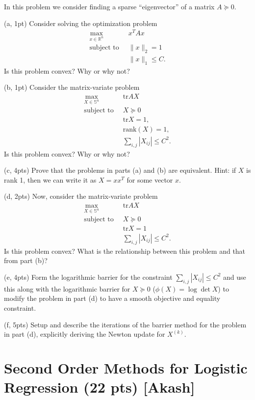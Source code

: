 \documentclass{article}
\theoremstyle{remark}
\theoremstyle{definition}
\newcommand{\st}{\mathop{\mathrm{subject\,\,to}}}
\def\tr{\mathrm{tr}}
\begin{document}
In this problem we consider finding a sparse ``eigenvector'' of a matrix $A
\succeq 0$.

\bigskip
\noindent
(a, 1pt) Consider solving the optimization problem
\[
\begin{split}
\max_{x\in\mathbb{R}^n} \;\; & x^TAx \\
\st \;\; & \|x\|_2 = 1 \\
\;\; & \|x\|_1 \le C.
\end{split}
\]
Is this problem convex? Why or why not?

\bigskip
\noindent
(b, 1pt) Consider the matrix-variate problem
\[
\begin{split}
\max_{X \in \mathbb{S}^n} \;\; & \tr AX \\
\st \;\; & X \succeq 0 \\
\;\; & \tr X = 1, \\ 
& \mathrm{rank}(X)=1, \\
& \sum_{i,j} |X_{ij}| \le C^2.
\end{split}
\]
Is this problem convex? Why or why not?
 
\bigskip
\noindent
(c, 4pts) Prove that the problems in parts (a) and (b) are equivalent.  Hint: if
$X$ is rank 1, then we can write it as $X=xx^T$ for some vector $x$.

\bigskip
\noindent
(d, 2pts) Now, consider the matrix-variate problem
\[
\begin{split}
\max_{X \in \mathbb{S}^n} \;\; & \tr AX \\
\st \;\; & X \succeq 0 \\
\;\; & \tr X = 1 \\
& \sum_{i,j} |X_{ij}| \le C^2.
\end{split}
\]
Is this problem convex?  What is the relationship between this problem and that
from part (b)?  

\bigskip
\noindent
(e, 4pts) Form the logarithmic barrier for the constraint $\sum_{i,j}|X_{ij}| \le C^2$
and use this along with the logarithmic barrier for $X \succeq 0$ ($\phi(X) =
\log \det X$) to modify the problem in part (d) to have a smooth objective and
equality constraint.

\bigskip
\noindent
(f, 5pts) Setup and describe the iterations of the barrier method for the problem in
part (d), explicitly deriving the Newton update for $X^{(k)}$.
\bigskip
\noindent
\section{Second Order Methods for Logistic Regression (22 pts) [Akash]}
\end{document}
